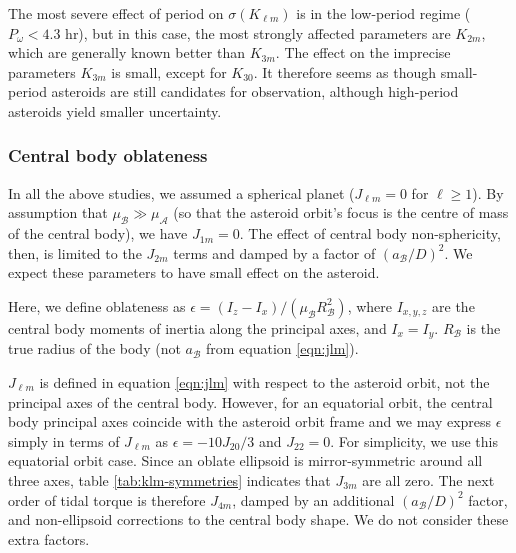 \documentclass[fleqn,usenatbib]{mnras}
\begin{document}
The most severe effect of period on $\sigma(K_{\ell m})$ is in the low-period regime ($P_\omega < 4.3$ hr), but in this case, the most strongly affected parameters are $K_{2m}$, which are generally known better than $K_{3m}$. The effect on the imprecise parameters $K_{3m}$ is small, except for $K_{30}$. It therefore seems as though small-period asteroids are still candidates for observation, although high-period asteroids yield smaller uncertainty.


\subsubsection{Central body oblateness}
\label{sec:scan-oblateness}

In all the above studies, we assumed a spherical planet ($J_{\ell m} = 0$ for $\ell \geq 1$). By assumption that $\mu_\mathcal{B} \gg \mu_\mathcal{A}$ (so that the asteroid orbit's focus is the centre of mass of the central body), we have $J_{1m} = 0$. The effect of central body non-sphericity, then, is limited to the $J_{2m}$ terms and damped by a factor of $(a_\mathcal{B} / D)^2$. We expect these parameters to have small effect on the asteroid.

Here, we define oblateness as $\epsilon = (I_z - I_x)/(\mu_\mathcal{B} R_\mathcal{B}^2)$, where $I_{x,y,z}$ are the central body moments of inertia along the principal axes, and $I_x = I_y$. $R_\mathcal{B}$ is the true radius of the body (not $a_\mathcal{B}$ from equation \ref{eqn:jlm}). 

$J_{\ell m}$ is defined in equation \ref{eqn:jlm} with respect to the asteroid orbit, not the principal axes of the central body. However, for an equatorial orbit, the central body principal axes coincide with the asteroid orbit frame and we may express $\epsilon$ simply in terms of $J_{\ell m}$ as $\epsilon = -10J_{20}/3$ and $J_{22} = 0$. For simplicity, we use this equatorial orbit case. Since an oblate ellipsoid is mirror-symmetric around all three axes, table \ref{tab:klm-symmetries} indicates that $J_{3m}$ are all zero. The next order of tidal torque is therefore $J_{4m}$, damped by an additional $(a_\mathcal{B}/D)^2$ factor, and non-ellipsoid corrections to the central body shape. We do not consider these extra factors.
\end{document}
